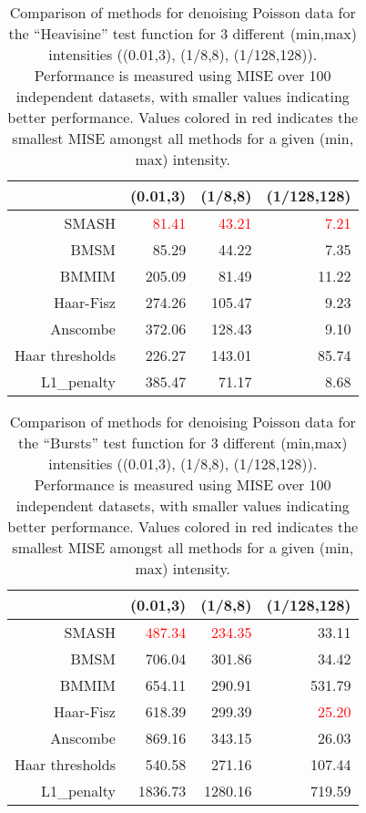 \documentclass[12pt]{article}
\begin{document}
\begin{table}[ht]
\centering
\begin{tabular}{rrrr}
  \hline
 & (0.01,3) & (1/8,8) & (1/128,128) \\ 
  \hline
SMASH & \textcolor{red}{81.41} & \textcolor{red}{43.21} & \textcolor{red}{7.21} \\ 
  BMSM & 85.29 & 44.22 & 7.35 \\ 
  BMMIM & 205.09 & 81.49 & 11.22 \\ 
  Haar-Fisz & 274.26 & 105.47 & 9.23 \\ 
  Anscombe & 372.06 & 128.43 & 9.10 \\ 
  Haar thresholds & 226.27 & 143.01 & 85.74 \\ 
  L1\_penalty & 385.47 & 71.17 & 8.68 \\ 
   \hline
\end{tabular}
\caption{Comparison of methods for denoising Poisson data for the ``Heavisine'' test function for 3 different (min,max) intensities ((0.01,3), (1/8,8), (1/128,128)). Performance is measured using MISE over 100 independent datasets, with smaller values indicating better performance. Values colored in red indicates the smallest MISE amongst all methods for a given (min, max) intensity.} 
\label{table:pois_hs}
\end{table}

\begin{table}[ht]
\centering
\begin{tabular}{rrrr}
  \hline
 & (0.01,3) & (1/8,8) & (1/128,128) \\ 
  \hline
SMASH & \textcolor{red}{487.34} & \textcolor{red}{234.35} & 33.11 \\ 
  BMSM & 706.04 & 301.86 & 34.42 \\ 
  BMMIM & 654.11 & 290.91 & 531.79 \\ 
  Haar-Fisz & 618.39 & 299.39 & \textcolor{red}{25.20} \\ 
  Anscombe & 869.16 & 343.15 & 26.03 \\ 
  Haar thresholds & 540.58 & 271.16 & 107.44 \\ 
  L1\_penalty & 1836.73 & 1280.16 & 719.59 \\ 
   \hline
\end{tabular}
\caption{Comparison of methods for denoising Poisson data for the ``Bursts'' test function for 3 different (min,max) intensities ((0.01,3), (1/8,8), (1/128,128)). Performance is measured using MISE over 100 independent datasets, with smaller values indicating better performance. Values colored in red indicates the smallest MISE amongst all methods for a given (min, max) intensity.} 
\label{table:pois_bur}
\end{table}
\end{document}
